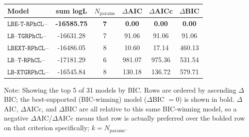 \begin{tabular}{lccccc}
\toprule
Model & sum logL & $N_{\text{params}}$ & $\Delta$AIC & $\Delta$AICc & $\Delta$BIC \\
\midrule
\textbf{$\texttt{LBE-T-RPhCL--}$} & \textbf{-16585.75} & \textbf{7} & \textbf{0.00} & \textbf{0.00} & \textbf{0.00} \\
$\texttt{LB--TGRPhCL--}$ & -16631.28 & 7 & 91.06 & 91.06 & 91.06 \\
$\texttt{LBEXT-RPhCL--}$ & -16486.05 & 8 & 10.60 & 17.14 & 460.13 \\
$\texttt{LB--T-RPhCL--}$ & -17181.29 & 6 & 981.07 & 975.36 & 531.54 \\
$\texttt{LB-XTGRPhCL--}$ & -16545.84 & 8 & 130.18 & 136.72 & 579.71 \\
\bottomrule
\end{tabular}
\par\footnotesize Note: Showing the top 5 of 31 models by BIC. Rows are ordered by ascending $\Delta$BIC; the best-supported (BIC-winning) model ($\Delta$BIC $= 0$) is shown in bold. $\Delta$AIC, $\Delta$AICc, and $\Delta$BIC are all relative to this same BIC-winning model, so a negative $\Delta$AIC/$\Delta$AICc means that row is actually preferred over the bolded row on that criterion specifically; $k = N_{\text{params}}$.
